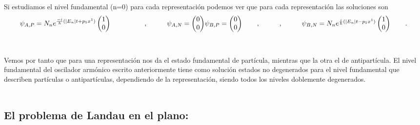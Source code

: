 \documentclass[11pt,letterpaper]{article}     %
\begin{document}
Si estudiamos el nivel fundamental (n=0) para cada representación podemos ver que para cada representación las soluciones son \\ 
\begin{equation}\label{eq:154}
\psi_{A,P}=N_n e^{\frac{-i}{\hbar}(|E_n|t + p_1 x^1)} \begin{pmatrix} 1 \\ 0 \end{pmatrix} \qquad \hspace{1cm}, \hspace{1cm} \psi_{A,N}= \begin{pmatrix} 0 \\ 0 \end{pmatrix} $$\\$$
\psi_{B,P}= \begin{pmatrix} 0 \\ 0 \end{pmatrix} \qquad , \hspace{1cm},\hspace{1cm} \psi_{B,N}=N_n e^{\frac{i}{\hbar}(|E_n|t - p_1 x^1)} \begin{pmatrix} 1 \\ 0 \end{pmatrix}  \qquad .
\end{equation} \\ \\
Vemos por tanto que para una representación nos da el estado fundamental de partícula, mientras que la otra el de antipartícula. El nivel fundamental del oscilador armónico escrito anteriormente tiene como solución estados no degenerados para el nivel fundamental que describen partículas o antipartículas, dependiendo de la representación, siendo todos los niveles doblemente degenerados. \\ \\






\subsection{El problema de Landau en el plano: }
\end{document}
